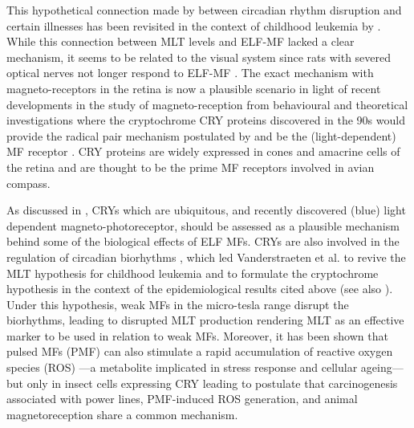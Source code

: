 \documentclass[a4]{article}
\begin{document}
 This hypothetical connection made by \citet{Stevens1996} between    circadian rhythm disruption and certain illnesses 
has been revisited in the context of childhood leukemia by \citet{Henshaw2005}. 
While this connection between MLT levels and ELF-MF lacked a clear mechanism, it seems to be related to the visual system since rats
with severed optical nerves not longer respond to ELF-MF \citep{Olcese1985}. The exact mechanism with magneto-receptors in the retina is now
a plausible scenario in light of recent developments in the study of magneto-reception from behavioural 
\citep[e.g.][]{Bazalova2016,Gegear2008,Johnsen2005,kirschvink1991,Phillips1992,Ritz2004,Ritz2009, Malkemper2015,Sherrard2018,Wiltschko2005,Winklhofer2013,Wiltschko2014,Wiltschko2016,Yoshii2009}
and  theoretical investigations \citep[e.g.][]{Hore2016,Ritz2010}
where the cryptochrome CRY proteins discovered in the 90s  \citep{Ahmad1993,Ahmad2007,Ahmad1999,Ahmad2016,Chasmore1999,Chaves2011} would provide the radical pair mechanism postulated by \citet{Schulten1978} and
be the (light-dependent) MF receptor 
 \citep{Hore2016,Liedvogel2010,Michael2017,Ritz2010b}.   
 CRY proteins are widely expressed in cones and amacrine cells of the retina \citep[e.g.][]{Foley2011,Wong2018} and are thought to be the prime MF receptors  involved in avian compass.
 
 As discussed in \citet{Lagroye2011}, CRYs which are ubiquitous, and   recently discovered (blue) light dependent magneto-photoreceptor,  should be assessed as a plausible mechanism behind some of the biological effects of ELF MFs.
 CRYs are also involved in the regulation of circadian biorhythms  \citep[e.g.][]{vanderHorst1999,Yoshii2009,Ono2013,Wong2018}, which led Vanderstraeten et al. 
 \citep{Vanderstraeten2012,Vanderstraeten2012a,Vanderstraeten2015,Vanderstraeten2017} to revive the MLT hypothesis for childhood leukemia
 and to formulate the cryptochrome hypothesis   in the context of the epidemiological results cited above (see also \citet{Lagroye2011,Juutilainen2018}). Under this hypothesis,
weak MFs in the micro-tesla range disrupt the biorhythms, leading to disrupted MLT production rendering MLT as an effective marker  to be used in relation to weak MFs.  Moreover, it has been shown that pulsed MFs (PMF) can also stimulate a rapid accumulation of reactive oxygen species (ROS) ---a  metabolite implicated in stress response and cellular ageing--- but  only in insect cells expressing CRY \citep{Sherrard2018} leading \citet{Landler2018} to postulate that  carcinogenesis associated with power lines, PMF-induced ROS generation, and animal magnetoreception share a common mechanism.
\end{document}
